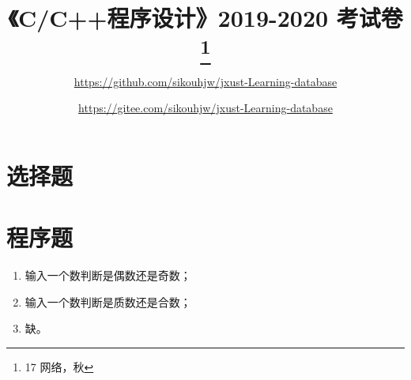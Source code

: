\documentclass{ctexart}
\title{《C/C++程序设计》2019-2020 考试卷\thanks{17 网络，秋}}
\author{\url{https://github.com/sikouhjw/jxust-Learning-database} \and \url{https://gitee.com/sikouhjw/jxust-Learning-database}}
\begin{document}
	\maketitle
	\section{选择题}
	
	\section{程序题}
	\begin{enumerate}
		\item 输入一个数判断是偶数还是奇数；
		\item 输入一个数判断是质数还是合数；
		\item 缺。
	\end{enumerate}
\end{document}
